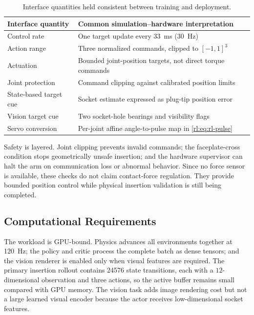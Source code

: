 \begin{table}[!ht]
\centering
\caption{Interface quantities held consistent between training and deployment.}
\label{rl:tab:rl-transfer}
\small
\setlength{\tabcolsep}{4pt}
\begin{tabular}{@{}p{}p{}@{}}
\toprule
Interface quantity & Common simulation--hardware interpretation \\
\midrule
Control rate & One target update every \SI{33}{\milli\second} (\SI{30}{\hertz}) \\
Action range & Three normalized commands, clipped to $[-1,1]^3$ \\
Actuation & Bounded joint-position targets, not direct torque commands \\
Joint protection & Command clipping against calibrated position limits \\
State-based target cue & Socket estimate expressed as plug-tip position error \\
Vision target cue & Two socket-hole bearings and visibility flags \\
Servo conversion & Per-joint affine angle-to-pulse map in \eqref{rl:eq:rl-pulse} \\
\bottomrule
\end{tabular}
\end{table}

Safety is layered. Joint clipping prevents invalid commands; the faceplate-cross condition stops geometrically unsafe insertion; and the hardware supervisor can halt the arm on communication loss or abnormal behavior. Since no force sensor is available, these checks do not claim contact-force regulation. They provide bounded position control while physical insertion validation is still being completed.

\rlFloatBarrier

\subsection{Computational Requirements}\label{rl:sec:rl-compute}

The workload is GPU-bound. Physics advances all environments together at \SI{120}{\hertz}; the policy and critic process the complete batch as dense tensors; and the vision renderer is enabled only when visual features are required. The primary insertion rollout contains \num{24576} state transitions, each with a $12$-dimensional observation and three actions, so the active buffer remains small compared with GPU memory. The vision task adds image rendering cost but not a large learned visual encoder because the actor receives low-dimensional socket features.

